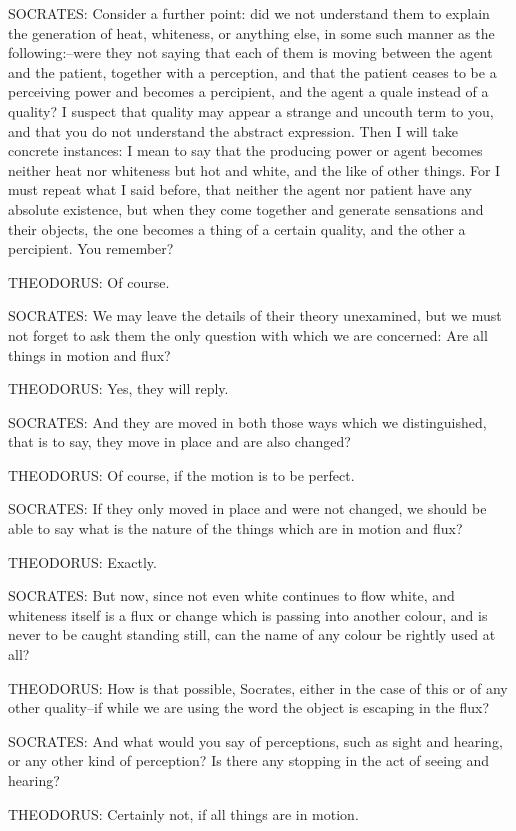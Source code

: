 SOCRATES: Consider a further point: did we not understand them to
explain the generation of heat, whiteness, or anything else, in some
such manner as the following:--were they not saying that each of them
is moving between the agent and the patient, together with a perception,
and that the patient ceases to be a perceiving power and becomes a
percipient, and the agent a quale instead of a quality? I suspect that
quality may appear a strange and uncouth term to you, and that you
do not understand the abstract expression. Then I will take concrete
instances: I mean to say that the producing power or agent becomes
neither heat nor whiteness but hot and white, and the like of other
things. For I must repeat what I said before, that neither the agent
nor patient have any absolute existence, but when they come together
and generate sensations and their objects, the one becomes a thing of a
certain quality, and the other a percipient. You remember?

THEODORUS: Of course.

SOCRATES: We may leave the details of their theory unexamined, but
we must not forget to ask them the only question with which we are
concerned: Are all things in motion and flux?

THEODORUS: Yes, they will reply.

SOCRATES: And they are moved in both those ways which we distinguished,
that is to say, they move in place and are also changed?

THEODORUS: Of course, if the motion is to be perfect.

SOCRATES: If they only moved in place and were not changed, we should
be able to say what is the nature of the things which are in motion and
flux?

THEODORUS: Exactly.

SOCRATES: But now, since not even white continues to flow white, and
whiteness itself is a flux or change which is passing into another
colour, and is never to be caught standing still, can the name of any
colour be rightly used at all?

THEODORUS: How is that possible, Socrates, either in the case of this
or of any other quality--if while we are using the word the object is
escaping in the flux?

SOCRATES: And what would you say of perceptions, such as sight and
hearing, or any other kind of perception? Is there any stopping in the
act of seeing and hearing?

THEODORUS: Certainly not, if all things are in motion.

